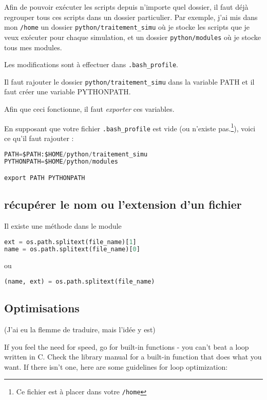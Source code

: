 \documentclass[a4paper,twoside]{article}
\begin{document}
Afin de pouvoir exécuter les scripts depuis n'importe quel dossier,  il faut déjà regrouper tous ces scripts dans un dossier particulier.  Par exemple, j'ai mis dans mon \texttt{/home} un dossier \texttt {python/traitement\_simu} où je stocke les scripts que je veux  exécuter pour chaque simulation, et un dossier \texttt{python/modules} où je stocke tous mes modules.

Les modifications sont à effectuer dans \texttt{.bash\_profile}.

Il faut rajouter le dossier \texttt{python/traitement\_simu} dans la  variable PATH et il faut créer une variable PYTHONPATH.

\begin{attention}
Afin que ceci fonctionne, il faut \emph{exporter} ces variables.
\end{attention}

En supposant que votre fichier \texttt{.bash\_profile} est vide (ou  n'existe pas.\footnote{Ce fichier est à placer dans votre \texttt{/home}}), voici ce qu'il faut rajouter :
\begin{lstlisting}[language=python]
PATH=$PATH:$HOME/python/traitement_simu
PYTHONPATH=$HOME/python/modules

export PATH PYTHONPATH
\end{lstlisting}

\subsection{récupérer le nom ou l'extension d'un fichier}
Il existe une méthode dans le module 
\begin{lstlisting}[language=python]
ext = os.path.splitext(file_name)[1]
name = os.path.splitext(file_name)[0]
\end{lstlisting}
ou 
\begin{lstlisting}[language=python]
(name, ext) = os.path.splitext(file_name)
\end{lstlisting}



\subsection{Optimisations}
(J'ai eu la flemme de traduire, mais l'idée y est)

If you feel the need for speed, go for built-in functions - you can't beat a loop written in C. Check the library manual for a built-in function that does what you want. If there isn't one, here are some guidelines for loop optimization:
\end{document}
